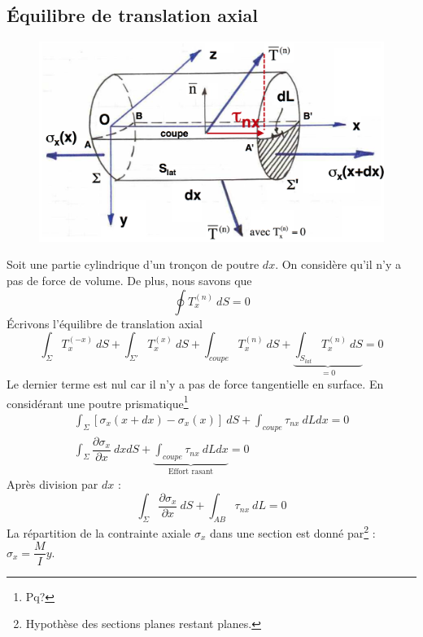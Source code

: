 	\subsection{Équilibre de translation axial}
	\begin{figure}
	\vspace{-23mm}
		\includegraphics[scale=0.2]{ch5/image7}
		\end{figure}
	Soit une partie cylindrique d'un tronçon de poutre $dx$. On considère qu'il 
	n'y a pas de force de volume. De plus, nous savons que
	\begin{equation}
	\oint T_x^{(n)}\ dS = 0
	\end{equation}
	Écrivons l'équilibre de translation axial
	\begin{equation}
	\int_\Sigma T_x^{(-x)}\ dS + \int_{\Sigma'} T_x^{(x)}\ dS + \int_{coupe} T_x^{(n)}\ 
	dS + \underbrace{\int_{S_{lat}}T_x^{(n)}\ dS}_{=0} = 0
	\end{equation}
	Le dernier terme est nul car il n'y a pas de force tangentielle en surface. 
	En considérant une poutre prismatique\footnote{Pq?}
	\begin{eqnarray}
	\int_\Sigma [\sigma_x(x+dx)-\sigma_x(x)]\ dS + \int_{coupe} \tau_{nx}\ dLdx = 0\\
	\int_\Sigma \dfrac{\partial \sigma_x}{\partial x}\ dxdS + \underbrace{\int_{coupe} 
	\tau_{nx}\ 	dLdx}_{\text{Effort rasant}} = 0
	\end{eqnarray}
	Après division par $dx$ :
	\begin{equation}
	\int_\Sigma \dfrac{\partial \sigma_x}{\partial x}\ dS + \int_{AB}\tau_{nx}\ dL=0
	\end{equation}
	La répartition de la contrainte 
	axiale $\sigma_x$ dans une section est donné par\footnote{Hypothèse des sections 
	planes restant planes.} :$\sigma_x = \dfrac{M}{I}y$.
